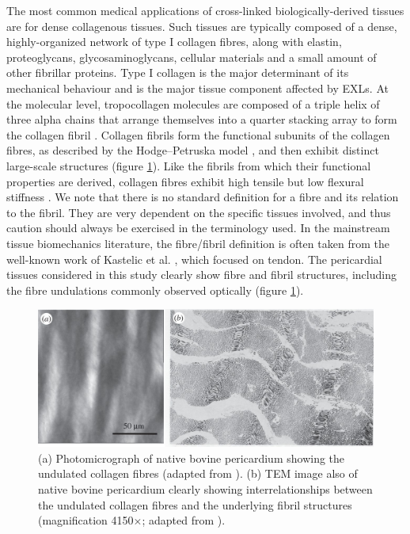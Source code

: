     The most common medical applications of cross-linked biologically-derived tissues are for dense collagenous tissues. Such tissues are typically composed of a dense, highly-organized network of type I collagen fibres, along with elastin, proteoglycans, glycosaminoglycans, cellular materials and a small amount of other fibrillar proteins. Type I collagen is the major determinant of its mechanical behaviour \cite{parry_molecular_1988,gelse_collagens_2003} and is the major tissue component affected by EXLs. At the molecular level, tropocollagen molecules are composed of a triple helix of three alpha chains \cite{parry_molecular_1988,gelse_collagens_2003} that arrange themselves into a quarter stacking array to form the collagen fibril \cite{parry_molecular_1988,gelse_collagens_2003}. Collagen fibrils form the functional subunits of the collagen fibres, as described by the Hodge–Petruska model \cite{parry_molecular_1988,petruska_subunit_1964}, and then exhibit distinct large-scale structures (figure \ref{c3:fig:1}). Like the fibrils from which their functional properties are derived, collagen fibres exhibit high tensile but low flexural stiffness \cite{sacks_biomechanics_2009}. We note that there is no standard definition for a fibre and its relation to the fibril. They are very dependent on the specific tissues involved, and thus caution should always be exercised in the terminology used. In the mainstream tissue biomechanics literature, the fibre/fibril definition is often taken from the well-known work of Kastelic et al. \cite{nimni_collagen_2018}, which focused on tendon. The pericardial tissues considered in this study clearly show fibre and fibril structures, including the fibre undulations commonly observed optically \cite{shen_stress_2008} (figure \ref{c3:fig:1}).
    
    
\begin{figure}
\centering
\includegraphics[width=\textwidth]{Images/chapter3/F1large.jpg}
\caption{(a) Photomicrograph of native bovine pericardium showing the undulated collagen fibres (adapted from \cite{sacks_incorporation_2003}). (b) TEM image also of native bovine pericardium clearly showing interrelationships between the undulated collagen fibres and the underlying fibril structures (magnification 4150$\times$; adapted from \cite{nimni_collagen_2018}).}
\label{c3:fig:1}
\end{figure}

